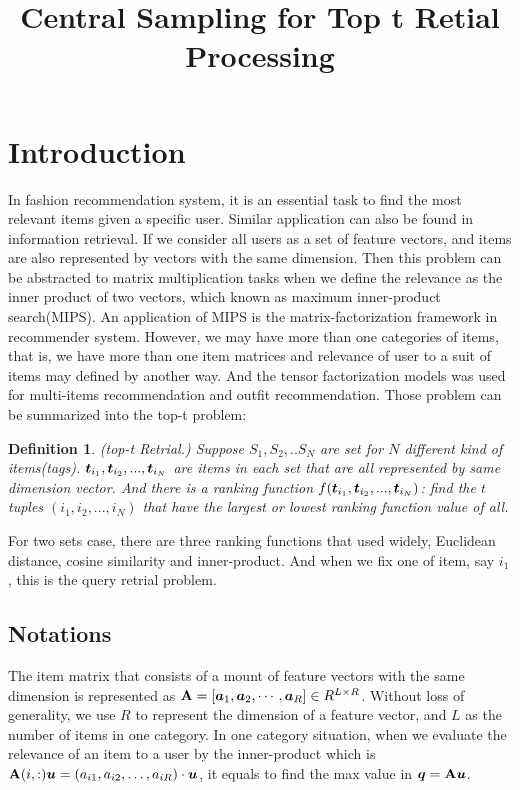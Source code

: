 \documentclass[letterpaper]{article}
\newcommand{\V}[1]{{\bm{{\MakeLowercase{#1}}}}}
\newcommand{\M}[1]{{\bm{\mathbf{\MakeUppercase{#1}}}}}
\newtheorem{definition}{Definition}
\begin{document}
\title{Central Sampling for Top t Retial Processing}
\date{}
\author{}
\maketitle

\section{Introduction}

In fashion recommendation system, it is an essential task to find the most relevant items given a specific user. Similar application can also be found in information retrieval. If we consider all users as a set of feature vectors, and items are also represented by vectors with the same dimension. Then this problem can be abstracted to matrix multiplication tasks when we define the relevance as the inner product of two vectors, which known as maximum inner-product search(MIPS). An application of MIPS is the  matrix-factorization framework in recommender system\cite{KoYe09}. However, we may have more than one categories of items, that is, we have more than one item matrices and relevance of user to a suit of items may defined by another way. And the tensor factorization models was used for multi-items recommendation\cite{Rendle10} and outfit recommendation\cite{HuYiLa15}. Those problem can be summarized into the top-t problem:

\begin{definition}\label{def:DefinitionTopt}
(top-t Retrial.) Suppose $S_1,S_2,..S_N$ are set for $N$ different kind of items(tags). $\V{t}_{i_1},\V{t}_{i_2},...,\V{t}_{i_N}$ are items in each set that are all represented by same dimension vector. And there is a ranking function $f(\V{t}_{i_1},\V{t}_{i_2},...,\V{t}_{i_N})$: find the $t$ tuples $(i_1,i_2,...,i_N)$ that have the largest or lowest ranking function value of all.
\end{definition}

For two sets case, there are three ranking functions that used widely, Euclidean distance, cosine similarity and inner-product. And when we fix one of item, say ${i_1}$, this is the query retrial problem.
\subsection{Notations}

The item matrix that consists of a mount of feature vectors with the same dimension is represented as $\M{A} =
[\V{a}_{1},\V{a}_{2},\cdots,\V{a}_{R}]\in R^{L\times R}$.  Without loss of generality, we use $R$ to represent the dimension of a feature vector, and $L$ as the number of items in one category. In one category situation, when we evaluate the relevance of an item to a user by the inner-product which is $\M{A}(i,:)\V{u}=(a_{i1},a_{i2},\ldots,a_{iR})\cdot\V{u}$, it equals to find the max value in $\V{q} = \M{a}\V{u}$.
\end{document}
